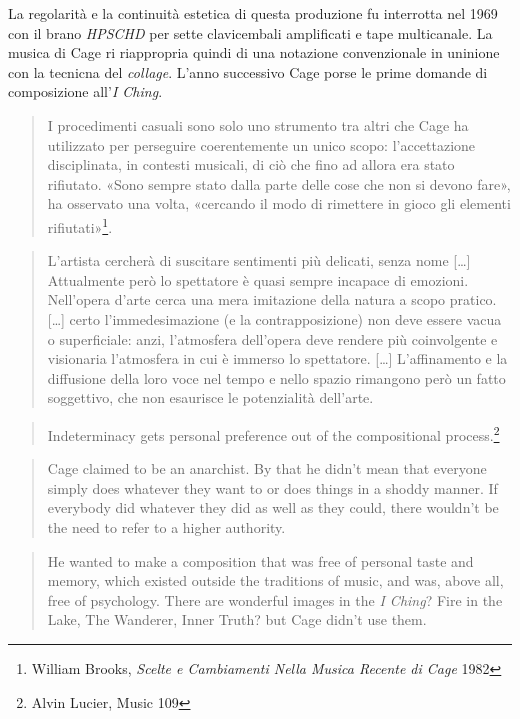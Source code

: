 La regolarit\`a e la continuit\`a estetica di questa produzione fu interrotta nel 1969
con il brano \emph{HPSCHD} per sette clavicembali amplificati e tape multicanale.
La musica di Cage ri riappropria quindi di una notazione convenzionale in uninione
con la tecnicna del \emph{collage}. L'anno successivo Cage porse le prime domande
di composizione all'\emph{I Ching}.

\begin{quote}
	I procedimenti casuali sono solo uno strumento tra altri che Cage ha utilizzato
	per perseguire coerentemente un unico scopo: l'accettazione disciplinata, in
	contesti musicali, di ci\`o che fino ad allora era stato rifiutato. «Sono sempre
	stato dalla parte delle cose che non si devono fare», ha osservato una volta,
	«cercando il modo di rimettere in gioco gli elementi rifiutati»\footnote{William
	Brooks, \emph{Scelte e Cambiamenti Nella Musica Recente di Cage} 1982}.
\end{quote}


\begin{quote}
	L'artista cercher\`a di suscitare sentimenti pi\`u delicati, senza nome [\ldots]
	Attualmente per\`o lo spettatore \`e quasi sempre incapace di emozioni.
	Nell'opera d'arte cerca una mera imitazione della natura a scopo pratico.
	[\ldots] certo l'immedesimazione (e la contrapposizione) non deve essere
	vacua o superficiale: anzi, l'atmosfera dell'opera deve rendere pi\`u
	coinvolgente e visionaria l'atmosfera in cui \`e immerso lo spettatore. [\ldots]
	L'affinamento e la diffusione della loro voce nel tempo e nello spazio
	rimangono per\`o un fatto soggettivo, che non esaurisce le potenzialit\`a dell'arte.
\end{quote}

\begin{quote}
	Indeterminacy gets personal preference out of the compositional process.\footnote{Alvin Lucier, Music 109}
\end{quote}

\begin{quote}
    Cage claimed to be an anarchist. By that he didn't mean that everyone simply does whatever they want to or does things in a shoddy manner. If everybody did whatever they did as well as they could, there wouldn't be the need to refer to a higher authority.
\end{quote}

\begin{quote}
	He wanted to make a composition that was free of personal taste and memory, which existed outside the traditions of music, and was, above all, free of psychology.
There are wonderful images in the \emph{I Ching}? Fire in the Lake, The Wanderer, Inner Truth? but Cage didn't use them.
\end{quote}

